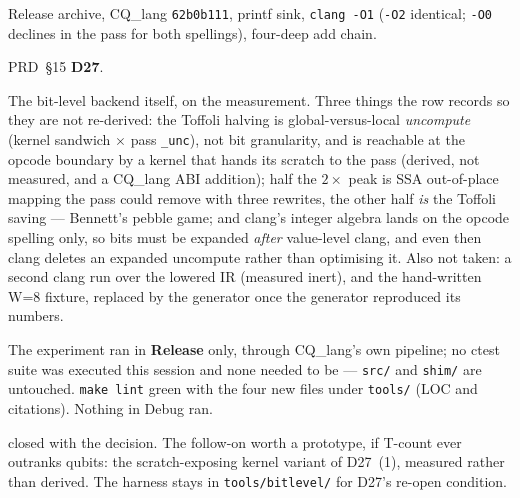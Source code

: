 Release archive, CQ\_lang \texttt{62b0b111}, printf sink, \texttt{clang -O1} (\texttt{-O2}
identical; \texttt{-O0} declines in the pass for both spellings), four-deep add chain.
\begin{figures}
\end{figures}

PRD~\S15 \textbf{D27}.

The bit-level backend itself, on the measurement. Three things the row records so they are not
re-derived: the Toffoli halving is global-versus-local \emph{uncompute} (kernel sandwich
$\times$ pass \texttt{\_unc}), not bit granularity, and is reachable at the opcode boundary by a
kernel that hands its scratch to the pass (derived, not measured, and a CQ\_lang ABI addition);
half the $2\times$ peak is SSA out-of-place mapping the pass could remove with three rewrites,
the other half \emph{is} the Toffoli saving --- Bennett's pebble game; and clang's integer algebra
lands on the opcode spelling only, so bits must be expanded \emph{after} value-level clang, and
even then clang deletes an expanded uncompute rather than optimising it. Also not taken: a
second clang run over the lowered IR (measured inert), and the hand-written W=8 fixture, replaced
by the generator once the generator reproduced its numbers.

The experiment ran in \textbf{Release} only, through CQ\_lang's own pipeline; no ctest suite was
executed this session and none needed to be --- \texttt{src/} and \texttt{shim/} are untouched.
\texttt{make lint} green with the four new files under \texttt{tools/} (LOC and citations).
Nothing in Debug ran.

 closed with the decision. The follow-on worth a prototype, if T-count ever outranks
qubits: the scratch-exposing kernel variant of D27~(1), measured rather than derived. The
harness stays in \texttt{tools/bitlevel/} for D27's re-open condition.
